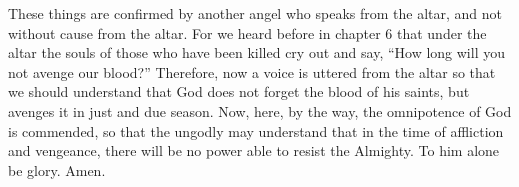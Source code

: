 These things are confirmed by another angel who speaks from the altar, and not without cause from the altar. For we heard before in chapter 6 that under the altar the souls of those who have been killed cry out and say, “How long will you not avenge our blood?” Therefore, now a voice is uttered from the altar so that we should understand that God does not forget the blood of his saints, but avenges it in just and due season. Now, here, by the way, the omnipotence of God is commended, so that the ungodly may understand that in the time of affliction and vengeance, there will be no power able to resist the Almighty. To him alone be glory. Amen.
